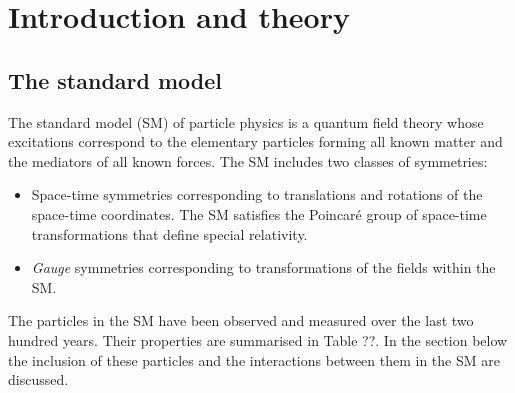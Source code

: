 \chapter{Introduction and theory}
\label{chap:theory}
\section{The standard model}

The standard model (SM) of particle physics is a quantum field theory whose excitations
correspond to the elementary particles forming all known matter and the mediators of
all known forces. The SM includes two classes of symmetries:

\begin{itemize}
\item Space-time symmetries corresponding to translations and rotations of the space-time coordinates.
The SM satisfies the Poincar\'{e} group of space-time transformations that define special relativity. 
\item \emph{Gauge} symmetries corresponding to transformations of the fields within the SM.
\end{itemize}

The particles in the SM have been observed and measured over the last two hundred years.
Their properties are summarised in Table ??. In the section below the inclusion of these
particles and the interactions between them in the SM are discussed.

